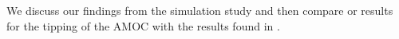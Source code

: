 We discuss our findings from the simulation study and then compare or results for the tipping of the AMOC with the results found in \cite{Ditlevsen2023}.